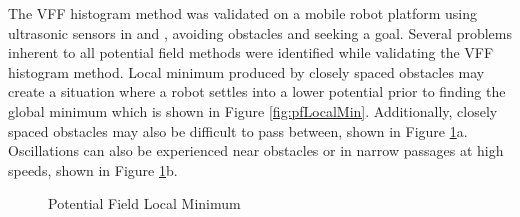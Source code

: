 \documentclass[numbered,pdftex]{ohio-etd}
\begin{document}
The VFF histogram method was validated on a mobile robot platform using ultrasonic sensors in \cite{borenstein_real-time_1990} and \cite{borenstein_vector_1991}, avoiding obstacles and seeking a goal. Several problems inherent to all potential field methods were identified while validating the VFF histogram method.  Local minimum produced by closely spaced obstacles may create a situation where a robot settles into a lower potential prior to finding the global minimum which is shown in Figure \ref{fig:pfLocalMin}. Additionally, closely spaced obstacles may also be difficult to pass between, shown in Figure \ref{fig:vff}a. Oscillations can also be experienced near obstacles or in narrow passages at high speeds, shown in Figure \ref{fig:vff}b. 

\begin{figure}[H]
	\begin{subfigmatrix}{2}%
		\centering
	\end{subfigmatrix}
	\caption{Potential Field Local Minimum \cite{liu_virtual-waypoint_2016}}
	\label{fig:vff}
\end{figure}
\end{document}
